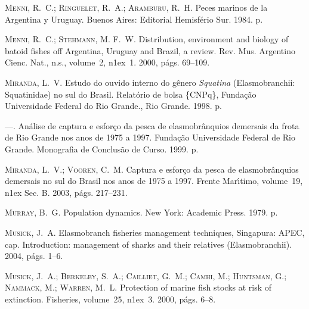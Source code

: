 \documentclass[a4paper,11pt,twoside,showtrims,onecolumn,openright,final]{memoir}
\begin{document}
\begin{thebibliography}{194}
\textsc{Menni, R.~C.; Ringuelet, R.~A.; Aramburu, R.~H.}
\newblock Peces marinos de la {A}rgentina y {U}ruguay.
\newblock Buenos Aires: Editorial Hemisf\'erio Sur. 1984.
 p.

\textsc{Menni, R.~C.; Stehmann, M. F.~W.}
\newblock Distribution, environment and biology of batoid fishes off
  {A}rgentina, {U}ruguay and {B}razil, a review.
\newblock Rev. Mus. Argentino Cienc. Nat., n.s., volume~2,
  n\raise1ex\hbox{}~1. 2000, p\'ags. 69--109.

\textsc{Miranda, L.~V.}
\newblock Estudo do ouvido interno do g\^enero \emph{{S}quatina} ({E}lasmobranchii:
  {S}quatinidae) no sul do {B}rasil.
\newblock Relat\'orio de bolsa \{CNPq\}, Funda\c{c}\~ao Universidade Federal do
  Rio Grande., Rio Grande. 1998.
 p.

---.
\newblock An\'alise de captura e esfor\c{c}o da pesca de elasmobr\^anquios
  demersais da frota de {R}io {G}rande nos anos de 1975 a 1997.
\newblock Funda\c{c}\~ao Universidade Federal de Rio Grande. Monografia de
  Conclus\~ao de Curso. 1999.
 p.

\textsc{Miranda, L.~V.; Vooren, C.~M.}
\newblock Captura e esfor\c{c}o da pesca de elasmobr\^anquios demersais no sul
  do {B}rasil nos anos de 1975 a 1997.
\newblock Frente Mar\'{\i}timo, volume~19,
  n\raise1ex\hbox{} Sec. B. 2003, p\'ags. 217--231.

\textsc{Murray, B.~G.}
\newblock Population dynamics.
\newblock New York: Academic Press. 1979.
 p.

\textsc{Musick, J.~A.}
\newblock Elasmobranch fisheries management techniques, Singapura: APEC, cap.
  Introduction: management of sharks and their relatives (Elasmobranchii).
  2004, p\'ags. 1--6.

\textsc{Musick, J.~A.; Berkeley, S.~A.; Cailliet, G.~M.; Camhi, M.; Huntsman,
  G.; Nammack, M.; Warren, M.~L.}
\newblock Protection of marine fish stocks at risk of extinction.
\newblock Fisheries, volume~25, n\raise1ex\hbox{}~3.
  2000{}, p\'ags. 6--8.


\end{thebibliography}
\end{document}
